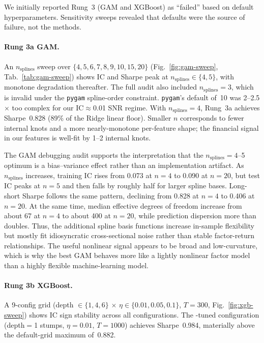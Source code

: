 \documentclass[11pt]{article}
\begin{document}
We initially reported Rung~3 (GAM and XGBoost) as ``failed'' based on
default hyperparameters. Sensitivity sweeps revealed that defaults were
the source of failure, not the methods.

\paragraph{Rung 3a GAM.}
An $n_{\text{splines}}$ sweep over
$\{4,5,6,7,8,9,10,15,20\}$ (Fig.~\ref{fig:gam-sweep},
Tab.~\ref{tab:gam-sweep}) shows IC and Sharpe peak at
$n_{\text{splines}}\in\{4,5\}$, with monotone degradation thereafter.
The full audit also included $n_{\text{splines}}=3$, which is invalid
under the \texttt{pygam} spline-order constraint. \texttt{pygam}'s
default of~10 was 2--2.5$\times$ too complex for our IC$\approx$0.01
SNR regime. With $n_{\text{splines}}{=}4$, Rung~3a achieves
Sharpe~0.828 (89\% of the Ridge linear floor). Smaller $n$ corresponds
to fewer internal knots and a more nearly-monotone per-feature shape;
the financial signal in our features is well-fit by 1--2 internal knots.

The GAM debugging audit supports the interpretation that the
$n_{\text{splines}}=4$--5 optimum is a bias--variance effect rather
than an implementation artifact. As $n_{\text{splines}}$ increases,
training IC rises from 0.073 at $n=4$ to 0.090 at $n=20$, but test IC
peaks at $n=5$ and then falls by roughly half for larger spline bases.
Long-short Sharpe follows the same pattern, declining from 0.828 at
$n=4$ to 0.406 at $n=20$. At the same time, median effective degrees of
freedom increase from about 67 at $n=4$ to about 400 at $n=20$, while
prediction dispersion more than doubles. Thus, the additional spline
basis functions increase in-sample flexibility but mostly fit
idiosyncratic cross-sectional noise rather than stable factor-return
relationships. The useful nonlinear signal appears to be broad and
low-curvature, which is why the best GAM behaves more like a lightly
nonlinear factor model than a highly flexible machine-learning model.

\paragraph{Rung 3b XGBoost.}
A 9-config grid (depth $\in \{1,4,6\}$ $\times$ $\eta \in \{0.01,
0.05, 0.1\}$, $T{=}300$, Fig.~\ref{fig:xgb-sweep}) shows IC sign
stability across all configurations. The \citet{gu_kelly_xiu}-tuned
configuration (depth$=$1 stumps, $\eta=0.01$, $T{=}1000$) achieves
Sharpe~0.984, materially above the default-grid maximum of~0.882.
\end{document}
